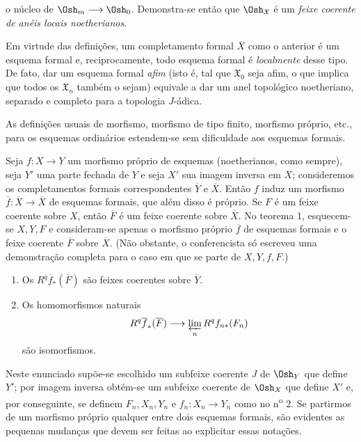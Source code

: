 o núcleo de $\Osh_m\longrightarrow\Osh_0$. Demonstra-se então que
$\Osh_{\mathfrak X}$ é um \emph{feixe coerente de anéis locais
noetherianos}.

Em virtude das definições, um completamento formal $\overline X$ como o
anterior é um esquema formal e, reciprocamente, todo esquema formal é
\emph{localmente} desse tipo. De fato, dar um esquema formal \emph{afim} (isto
é, tal que $\mathfrak X_0$ seja afim, o que implica que todos os
$\mathfrak X_n$ também o sejam) equivale a dar um anel topológico noetheriano,
separado e completo para a topologia $J$-ádica.

As definições usuais de morfismo, morfismo de tipo finito, morfismo
próprio, etc., para os esquemas ordinários estendem-se sem dificuldade aos
esquemas formais.


Seja $f:X\longrightarrow Y$ um morfismo próprio de esquemas (noetherianos, como
sempre), seja $Y'$ uma parte fechada de $Y$ e seja $X'$ sua imagem inversa em
$X$; consideremos os completamentos formais correspondentes $\overline Y$ e
$\overline X$. Então $f$ induz um morfismo
$\overline f:\overline X\longrightarrow\overline X$ de esquemas formais, que
além disso é próprio. Se $F$ é um feixe coerente sobre $X$, então $\overline F$
é um feixe coerente sobre $\overline X$. No teorema 1, esquecem-se $X,Y,F$ e
consideram-se apenas o morfismo próprio $\overline f$ de esquemas formais e o
feixe coerente $\overline F$ sobre $\overline X$. (Não obstante, o conferencista
só escreveu uma demonstração completa para o caso em que se parte de
$X,Y,f,F$.)

\begin{enumerate}
  \item[\textit{i.}] Os $R^{q}\overline f_{*}(\overline F)$ são feixes
    coerentes sobre $\overline Y$.
  \item[\textit{ii.}] Os homomorfismos naturais
    \[
      R^{q}\overline f_{*}(\overline F)
      \longrightarrow \varprojlim_n R^{q}f_{n*}(F_n)
    \]
    são isomorfismos.
\end{enumerate}

Neste enunciado supõe-se escolhido um subfeixe coerente $J$ de $\Osh_Y$ que
define $Y'$; por imagem inversa obtém-se um subfeixe coerente de $\Osh_X$ que
define $X'$ e, por conseguinte, se definem $F_n,X_n,Y_n$ e
$f_n:X_n\longrightarrow Y_n$ como no n\textsuperscript{o} 2. Se partirmos de
um morfismo próprio qualquer entre dois esquemas formais, são evidentes as
pequenas mudanças que devem ser feitas ao explicitar essas notações.


